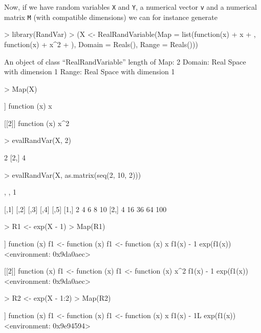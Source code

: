 \documentclass[11pt]{article}
\begin{document}
Now, if we have random variables {\tt X} and {\tt Y}, a numerical
vector {\tt v} and a numerical matrix {\tt M} (with compatible dimensions)
we can for instance generate
\begin{Schunk}
\begin{Sinput}
> library(RandVar)
> (X <- RealRandVariable(Map = list(function(x) {
+     x
+ }, function(x) {
+     x^2
+ }), Domain = Reals(), Range = Reals()))
\end{Sinput}
\begin{Soutput}
An object of class “RealRandVariable” 
length of Map:	 2 
Domain:	Real Space with dimension 1 
Range:	Real Space with dimension 1 
\end{Soutput}
\begin{Sinput}
> Map(X)
\end{Sinput}
\begin{Soutput}
[[1]]
function (x) 
{
    x
}

[[2]]
function (x) 
{
    x^2
}
\end{Soutput}
\begin{Sinput}
> evalRandVar(X, 2)
\end{Sinput}
\begin{Soutput}
     [,1]
[1,]    2
[2,]    4
\end{Soutput}
\begin{Sinput}
> evalRandVar(X, as.matrix(seq(2, 10, 2)))
\end{Sinput}
\begin{Soutput}
, , 1

     [,1] [,2] [,3] [,4] [,5]
[1,]    2    4    6    8   10
[2,]    4   16   36   64  100
\end{Soutput}
\begin{Sinput}
> R1 <- exp(X - 1)
> Map(R1)
\end{Sinput}
\begin{Soutput}
[[1]]
function (x) 
{
    f1 <- function (x) 
    {
        f1 <- function (x) 
        {
            x
        }
        f1(x) - 1
    }
    exp(f1(x))
}
<environment: 0x9da0aec>

[[2]]
function (x) 
{
    f1 <- function (x) 
    {
        f1 <- function (x) 
        {
            x^2
        }
        f1(x) - 1
    }
    exp(f1(x))
}
<environment: 0x9da0aec>
\end{Soutput}
\begin{Sinput}
> R2 <- exp(X - 1:2)
> Map(R2)
\end{Sinput}
\begin{Soutput}
[[1]]
function (x) 
{
    f1 <- function (x) 
    {
        f1 <- function (x) 
        {
            x
        }
        f1(x) - 1L
    }
    exp(f1(x))
}
<environment: 0x9e94594>


\end{Soutput}
\end{Schunk}
\end{document}
